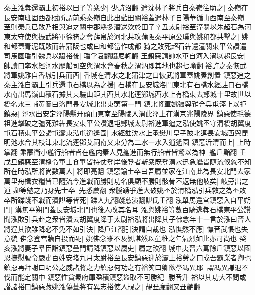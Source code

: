 秦主泓犇還灞上初裕以田子等衆少|{
	少詩沼翻}
遣沈林子將兵自秦嶺往助之|{
	秦嶺在長安南班固西都賦所謂前乘秦嶺自此出藍田關裕蓋遣林子自陽華循山西南至秦嶺}
至則秦兵已敗乃相與追之關中郡縣多潛送欵於田子辛丑太尉裕至潼關以朱超石為河東太守使與振武將軍徐猗之會薛帛於河北共攻蒲阪秦平原公璞與姚和都共擊之|{
	姚和都蓋青泥既敗而犇蒲阪也或曰和都當作成都}
猗之敗死超石犇還潼關東平公讚遣司馬國璠引魏兵以躡裕後|{
	璠孚袁翻躡尼輒翻}
王鎮惡請帥水軍自河入渭以趨長安|{
	帥讀曰率水經河水歷船司空與渭水會春秋之渭汭即其地也趨七喻翻}
裕許之秦恢武將軍姚難自香城引兵而西|{
	香城在渭水之北蒲津之口恢武將軍蓋姚秦創置}
鎮惡追之秦主泓自灞上引兵還屯石橋以為之援|{
	石橋在長安城洛門東北有石橋水經註曰石橋水南出馬嶺山積石據其東驪山距其西其水北逕鄭城西水上有橋東去鄭城十里故世以橋名水三輔黄圖曰洛門長安城北出東頭第一門}
鎮北將軍姚彊與難合兵屯涇上以拒鎮惡|{
	涇水出安定涇陽縣开頭山東南至陽陵入渭此涇上在漢京兆陽陵界}
鎮惡使毛德祖進擊破之彊死難犇長安東平公讚退屯鄭城太尉裕進軍逼之泓使姚丕守渭橋胡翼度屯石積東平公讚屯灞東泓屯逍遙園|{
	水經註沈水上承樊川皇子陂北逕長安城西與昆明池水合其枝津東北流逕鄧艾祠南又東分為二水一水入逍遙園}
鎮惡沂渭而上|{
	上時掌翻}
乘蒙衝小艦行船者皆在艦内秦人見艦進而無行船者皆驚以為神|{
	艦戶黯翻}
壬戌旦鎮惡至渭橋令軍士食畢皆持仗登岸後登者斬衆既登渭水迅急艦皆隨流倏忽不知所在時泓所將尚數萬人|{
	將即亮翻}
鎮惡諭士卒曰吾屬並家在江南此為長安北門去家萬里舟楫衣糧皆已隨流今進戰而勝則功名俱顯不勝則骸骨不返無他岐矣|{
	岐旁出之道}
卿等勉之乃身先士卒|{
	先悉薦翻}
衆騰踴爭進大破姚丕於渭橋泓引兵救之為丕敗卒所蹂踐不戰而潰諶等皆死|{
	蹂人九翻踐慈演翻諶氏壬翻}
泓單馬還宫鎮惡入自平朔門|{
	漢無平朔門蓋長安城北門也後人改其名耳}
泓與姚裕等數百騎逃犇石橋東平公讚聞泓敗引兵赴之衆皆潰去胡翼度降于太尉裕泓將出降其子佛念年十一言於泓曰晉人將逞其欲雖降必不免不如引決|{
	降戶江翻引決謂自裁也}
泓憮然不應|{
	憮音武悵也失意貌}
佛念登宫牆自投而死|{
	姚佛念雖不及劉諶然以童稚之年氣烈如此亦可尚也}
癸亥泓將妻子羣臣詣鎮惡壘門請降鎮惡以屬吏|{
	屬之欲翻}
城中夷晉六萬餘戶鎮惡以國恩撫慰號令嚴肅百姓安堵九月太尉裕至長安鎮惡迎於灞上裕勞之曰成吾霸業者卿也鎮惡再拜謝曰明公之威諸將之力鎮惡何功之有裕笑曰卿欲學馮異耶|{
	謂馮異謙退不伐而能定關中}
鎮惡性貪秦府庫盈積鎮惡盜取不可勝紀|{
	勝音升}
裕以其功大不問或譛諸裕曰鎮惡藏姚泓偽輦將有異志裕使人覘之|{
	覘丑廉翻又丑艶翻}
